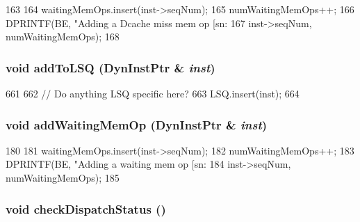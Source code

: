 \begin{DoxyCode}
163     {
164         waitingMemOps.insert(inst->seqNum);
165         numWaitingMemOps++;
166         DPRINTF(BE, "Adding a Dcache miss mem op [sn:%
167                 inst->seqNum, numWaitingMemOps);
168     }
\end{DoxyCode}
\hypertarget{classLWBackEnd_a1b9c2184abc4f4e7a00285130f39bf26}{
\subsubsection[{addToLSQ}]{\setlength{\rightskip}{0pt plus 5cm}void addToLSQ ({\bf DynInstPtr} \& {\em inst})}}
\label{classLWBackEnd_a1b9c2184abc4f4e7a00285130f39bf26}



\begin{DoxyCode}
661 {
662     // Do anything LSQ specific here?
663     LSQ.insert(inst);
664 }
\end{DoxyCode}
\hypertarget{classLWBackEnd_a965a423ceedaeb3ec978531621234d0e}{
\subsubsection[{addWaitingMemOp}]{\setlength{\rightskip}{0pt plus 5cm}void addWaitingMemOp ({\bf DynInstPtr} \& {\em inst})}}
\label{classLWBackEnd_a965a423ceedaeb3ec978531621234d0e}



\begin{DoxyCode}
180     {
181         waitingMemOps.insert(inst->seqNum);
182         numWaitingMemOps++;
183         DPRINTF(BE, "Adding a waiting mem op [sn:%
184                 inst->seqNum, numWaitingMemOps);
185     }
\end{DoxyCode}
\hypertarget{classLWBackEnd_aee5c9997a61eb30564062dcdbda8c246}{
\subsubsection[{checkDispatchStatus}]{\setlength{\rightskip}{0pt plus 5cm}void checkDispatchStatus ()}}
\label{classLWBackEnd_aee5c9997a61eb30564062dcdbda8c246}



